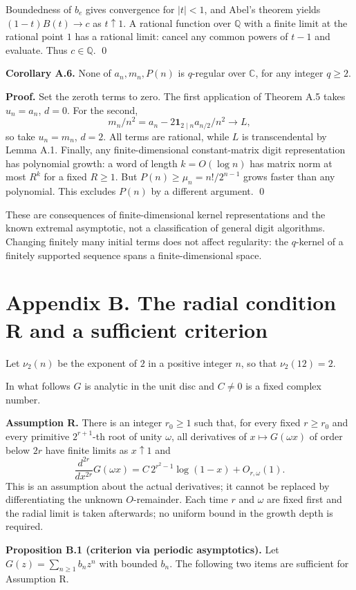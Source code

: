 \documentclass[11pt]{article}
\begin{document}
Boundedness of $b_e$ gives convergence for $|t|<1$, and Abel's theorem yields $(1-t)B(t)\to c$ as $t\uparrow1$. A rational function over $\mathbb Q$ with a finite limit at the rational point $1$ has a rational limit: cancel any common powers of $t-1$ and evaluate. Thus $c\in\mathbb Q$. \qed

\textbf{Corollary A.6.} None of $a_n,m_n,P(n)$ is $q$-regular over $\mathbb C$, for any integer $q\ge2$.

\textbf{Proof.} Set the zeroth terms to zero. The first application of Theorem A.5 takes $u_n=a_n$, $d=0$. For the second,
\[
 m_n/n^2=a_n-2\mathbf1_{2\mid n}a_{n/2}/n^2\longrightarrow L,
\]
so take $u_n=m_n$, $d=2$. All terms are rational, while $L$ is transcendental by Lemma A.1. Finally, any finite-dimensional constant-matrix digit representation has polynomial growth: a word of length $k=O(\log n)$ has matrix norm at most $R^k$ for a fixed $R\ge1$. But $P(n)\ge\mu_n=n!/2^{n-1}$ grows faster than any polynomial. This excludes $P(n)$ by a different argument. \qed

These are consequences of finite-dimensional kernel representations and the known extremal asymptotic, not a classification of general digit algorithms. Changing finitely many initial terms does not affect regularity: the $q$-kernel of a finitely supported sequence spans a finite-dimensional space.

\section*{Appendix B. The radial condition R and a sufficient criterion}
Let $\nu_2(n)$ be the exponent of $2$ in a positive integer $n$, so that $\nu_2(12)=2$.

In what follows $G$ is analytic in the unit disc and $C\ne0$ is a fixed complex number.

\textbf{Assumption R.} There is an integer $r_0\ge1$ such that, for every fixed $r\ge r_0$ and every primitive $2^{r+1}$-th root of unity $\omega$, all derivatives of $x\mapsto G(\omega x)$ of order below $2r$ have finite limits as $x\uparrow1$ and
\[
\frac{d^{2r}}{dx^{2r}}G(\omega x)=C\,2^{r^2-1}\log(1-x)+O_{r,\omega}(1).
\]
This is an assumption about the actual derivatives; it cannot be replaced by differentiating the unknown $O$-remainder. Each time $r$ and $\omega$ are fixed first and the radial limit is taken afterwards; no uniform bound in the growth depth is required.

\textbf{Proposition B.1 (criterion via periodic asymptotics).} Let $G(z)=\sum_{n\ge1}b_nz^n$ with bounded $b_n$. The following two items are sufficient for Assumption R.
\end{document}
